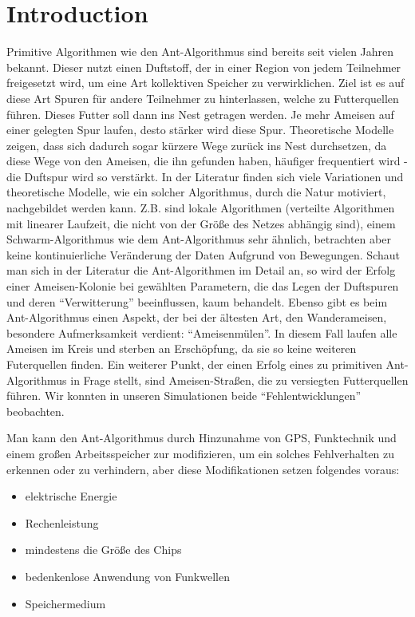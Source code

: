 \section{Introduction}\label{introduction}

Primitive Algorithmen wie den Ant-Algorithmus sind bereits seit vielen
Jahren bekannt. Dieser nutzt einen Duftstoff, der in einer Region von
jedem Teilnehmer freigesetzt wird, um eine Art kollektiven Speicher zu
verwirklichen. Ziel ist es auf diese Art Spuren für andere Teilnehmer zu
hinterlassen, welche zu Futterquellen führen. Dieses Futter soll dann
ins Nest getragen werden. Je mehr Ameisen auf einer gelegten Spur
laufen, desto stärker wird diese Spur. Theoretische Modelle zeigen, dass
sich dadurch sogar kürzere Wege zurück ins Nest durchsetzen, da diese
Wege von den Ameisen, die ihn gefunden haben, häufiger frequentiert wird
- die Duftspur wird so verstärkt. In der Literatur finden sich viele
Variationen und theoretische Modelle, wie ein solcher Algorithmus, durch
die Natur motiviert, nachgebildet werden kann. Z.B. sind lokale
Algorithmen (verteilte Algorithmen mit linearer Laufzeit, die nicht von
der Größe des Netzes abhängig sind), einem Schwarm-Algorithmus wie dem
Ant-Algorithmus sehr ähnlich, betrachten aber keine kontinuierliche
Veränderung der Daten Aufgrund von Bewegungen. Schaut man sich in der
Literatur die Ant-Algorithmen im Detail an, so wird der Erfolg einer
Ameisen-Kolonie bei gewählten Parametern, die das Legen der Duftspuren
und deren ``Verwitterung'' beeinflussen, kaum behandelt. Ebenso gibt es
beim Ant-Algorithmus einen Aspekt, der bei der ältesten Art, den
Wanderameisen, besondere Aufmerksamkeit verdient: ``Ameisenmülen''. In
diesem Fall laufen alle Ameisen im Kreis und sterben an Erschöpfung, da
sie so keine weiteren Futerquellen finden. Ein weiterer Punkt, der einen
Erfolg eines zu primitiven Ant-Algorithmus in Frage stellt, sind
Ameisen-Straßen, die zu versiegten Futterquellen führen. Wir konnten in
unseren Simulationen beide ``Fehlentwicklungen'' beobachten.

Man kann den Ant-Algorithmus durch Hinzunahme von GPS, Funktechnik und
einem großen Arbeitsspeicher zur modifizieren, um ein solches
Fehlverhalten zu erkennen oder zu verhindern, aber diese Modifikationen
setzen folgendes voraus:

\begin{itemize}
\tightlist
\item
  elektrische Energie
\item
  Rechenleistung
\item
  mindestens die Größe des Chips
\item
  bedenkenlose Anwendung von Funkwellen
\item
  Speichermedium
\end{itemize}

